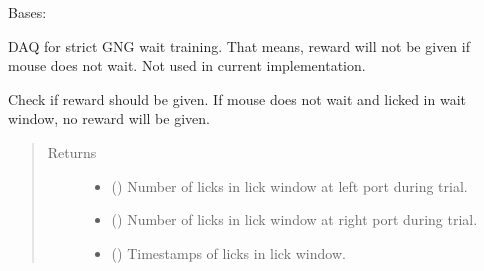 \documentclass[letterpaper,10pt,english]{sphinxmanual}
\begin{document}
\begin{fulllineitems}
\label{\detokenize{NoSeMazeController/daqface:daqface.DAQ.DoAiMultiTaskWaitTraining}}
\pysigstartsignatures
{}
\pysigstopsignatures
\sphinxAtStartPar
Bases: 

\sphinxAtStartPar
DAQ for strict GNG wait training. That means, reward will not be given
if mouse does not wait. Not used in current implementation.

\begin{fulllineitems}
\label{\detokenize{NoSeMazeController/daqface:daqface.DAQ.DoAiMultiTaskWaitTraining.CheckLicks}}
\pysigstartsignatures
{}
\pysigstopsignatures
\sphinxAtStartPar
Check if reward should be given. If mouse does not wait and licked in
wait window, no reward will be given.
\begin{quote}\begin{description}
\item[{Returns}] \leavevmode
\sphinxAtStartPar
\begin{itemize}
\item {} 
\sphinxAtStartPar
{} () \textendash{} Number of licks in lick window at left port during trial.

\item {} 
\sphinxAtStartPar
{} () \textendash{} Number of licks in lick window at right port during trial.

\item {} 
\sphinxAtStartPar
{} () \textendash{} Timestamps of licks in lick window.


\end{itemize}
\end{description}
\end{quote}
\end{fulllineitems}
\end{fulllineitems}
\end{document}
